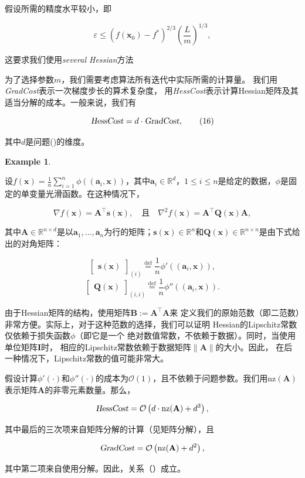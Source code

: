 \documentclass[a4paper,twoside,AutoFakeBold]{article}
\theoremstyle{definition}
\newtheorem{exmp2}{{Example}}[section]
\begin{document}
假设所需的精度水平较小，即

\[
\varepsilon \leq \left(f(\mathbf{x}_0) - f^*\right)^{2/3} \left(\frac{L}{m}\right)^{1/3},
\]

这要求我们使用\textit{several Hessian}方法

为了选择参数\(m\)，我们需要考虑算法所有迭代中实际所需的计算量。
我们用\textsl{GradCost}表示一次梯度步长的算术复杂度，
用\textsl{HessCost}表示计算Hessian矩阵及其适当分解的成本。一般来说，我们有

\begin{equation}\label{16}
\textsl{HessCost} = d \cdot \textsl{GradCost}, \tag{16}
\end{equation}

其中\(d\)是问题()的维度。

\begin{exmp2}\label{exam:3.2}


设\(f(\mathbf{x}) = \frac{1}{n} \sum_{i=1}^{n} \phi((\mathbf{a}_i, \mathbf{x}))\)，其中\(\mathbf{a}_i \in \mathbb{R}^d\)，\(1 \leq i \leq n\)是给定的数据，\(\phi\)是固定的单变量光滑函数。在这种情况下，

\[
\nabla f(\mathbf{x}) = \mathbf{A}^\top \mathbf{s}(\mathbf{x}), \quad \text{且} \quad \nabla^2 f(\mathbf{x}) = \mathbf{A}^\top \mathbf{Q}(\mathbf{x}) \mathbf{A},
\]

其中\(\mathbf{A} \in \mathbb{R}^{n \times d}\)是以\(\mathbf{a}_1, \ldots, \mathbf{a}_n\)为行的矩阵；\(\mathbf{s}(\mathbf{x}) \in \mathbb{R}^n\)和\(\mathbf{Q}(\mathbf{x}) \in \mathbb{R}^{n \times n}\)是由下式给出的对角矩阵：

\[
\begin{bmatrix}
\mathbf{s}(\mathbf{x})
\end{bmatrix}_{(i)} \stackrel{\text{def}}{=} \frac{1}{n} \phi'((\mathbf{a}_i, \mathbf{x})),
\]
\[
\begin{bmatrix}
\mathbf{Q}(\mathbf{x})
\end{bmatrix}_{(i,i)} \stackrel{\text{def}}{=} \frac{1}{n} \phi''((\mathbf{a}_i, \mathbf{x})).
\]

由于Hessian矩阵的结构，使用矩阵\(\mathbf{B} := \mathbf{A}^\top \mathbf{A}\)来
定义我们的原始范数（即二范数）非常方便。实际上，对于这种范数的选择，我们可以证明
Hessian的Lipschitz常数仅依赖于损失函数\(\phi\)（即它是一个
绝对数值常数，不依赖于数据）。同时，当使用单位矩阵\(\mathbf{I}\)时，
相应的Lipschitz常数依赖于数据矩阵\(\|\mathbf{A}\|\)的大小。因此，
在后一种情况下，Lipschitz常数的值可能非常大。

假设计算\(\phi'(\cdot)\)和\(\phi''(\cdot)\)的成本为\(\mathcal{O}(1)\)，且不依赖于问题参数。我们用\(\mathrm{nz}(\mathbf{A})\)表示矩阵\(\mathbf{A}\)的非零元素数量。那么，

\[
\textsl{HessCost} = \mathcal{O}\left( d \cdot \mathrm{nz}(\mathbf{A}) + d^3 \right),
\]

其中最后的三次项来自矩阵分解的计算（见矩阵分解），且

\[
\textsl{GradCost} = \mathcal{O}\left( \mathrm{nz}(\mathbf{A}) + d^2 \right),
\]

其中第二项来自使用分解。因此，关系（）成立。

\end{exmp2}
\end{document}
